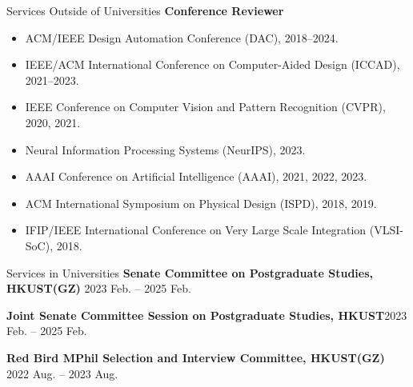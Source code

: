 \begin{rSection}{Services Outside of Universities}
\textbf{Conference Reviewer}
\begin{itemize}
    \item ACM/IEEE Design Automation Conference (DAC), 2018--2024.
    \item IEEE/ACM International Conference on Computer-Aided Design (ICCAD), 2021--2023.
    \item IEEE Conference on Computer Vision and Pattern Recognition (CVPR), 2020, 2021.
    \item Neural Information Processing Systems (NeurIPS), 2023.
    \item AAAI Conference on Artificial Intelligence (AAAI), 2021, 2022, 2023.
    \item ACM International Symposium on Physical Design (ISPD), 2018, 2019.
    \item IFIP/IEEE International Conference on Very Large Scale Integration (VLSI-SoC), 2018.
\end{itemize}
\end{rSection}

\begin{rSection}{Services in Universities}
{\bf Senate Committee on Postgraduate Studies, HKUST(GZ)}\hfill { 2023 Feb. -- 2025 Feb.}

{\bf Joint Senate Committee Session on Postgraduate Studies, HKUST}\hfill {2023 Feb. -- 2025 Feb.}

{\bf Red Bird MPhil Selection and Interview Committee, HKUST(GZ)}\hfill { 2022 Aug. -- 2023 Aug.}
\end{rSection}
